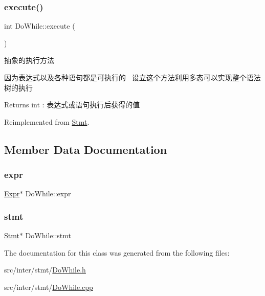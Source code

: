\subsubsection{\texorpdfstring{execute()}{execute()}}
{\footnotesize\ttfamily int Do\+While\+::execute (\begin{DoxyParamCaption}{ }\end{DoxyParamCaption})\hspace{0.3cm}{\ttfamily [virtual]}}



抽象的执行方法 

因为表达式以及各种语句都是可执行的~\newline
设立这个方法利用多态可以实现整个语法树的执行~\newline
 \begin{DoxyReturn}{Returns}
int \+: 表达式或语句执行后获得的值 
\end{DoxyReturn}


Reimplemented from \hyperlink{class_stmt_abdc3261770c3c5bd3ce5b3ba6eedfaa4}{Stmt}.



\subsection{Member Data Documentation}
\mbox{\label{class_do_while_a55d5ffb9c6bee10f8375f028705e4901}} 
\subsubsection{\texorpdfstring{expr}{expr}}
{\footnotesize\ttfamily \hyperlink{class_expr}{Expr}$\ast$ Do\+While\+::expr}

\mbox{\label{class_do_while_a0aee68f104ddceeb30a4e061cf315e0f}} 
\subsubsection{\texorpdfstring{stmt}{stmt}}
{\footnotesize\ttfamily \hyperlink{class_stmt}{Stmt}$\ast$ Do\+While\+::stmt}



The documentation for this class was generated from the following files\+:\begin{DoxyCompactItemize}
\item 
src/inter/stmt/\hyperlink{_do_while_8h}{Do\+While.\+h}\item 
src/inter/stmt/\hyperlink{_do_while_8cpp}{Do\+While.\+cpp}\end{DoxyCompactItemize}
